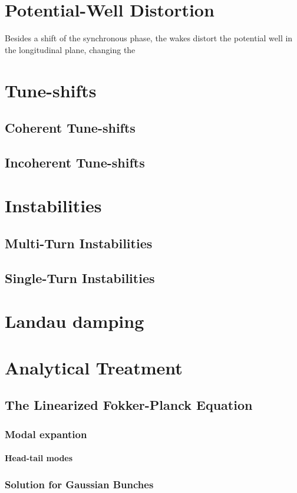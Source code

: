 \section{Potential-Well Distortion}

    Besides a shift of the synchronous phase, the wakes distort the potential well in the longitudinal plane, changing the

\section{Tune-shifts}
\subsection{Coherent Tune-shifts}
\subsection{Incoherent Tune-shifts}
\section{Instabilities}
\subsection{Multi-Turn Instabilities}
\subsection{Single-Turn Instabilities}
\section{Landau damping}
\section{Analytical Treatment}
\subsection{The Linearized Fokker-Planck Equation}
\subsubsection{Modal expantion}
\paragraph{Head-tail modes}
\subsubsection{Solution for Gaussian Bunches}
